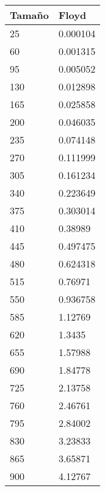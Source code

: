 \begin{tabular}[H]{|ll|}
\hline
\textbf{Tamaño} & \textbf{Floyd} \\ \hline
25 & 0.000104 \\ \hline
60 & 0.001315 \\ \hline
95 & 0.005052 \\ \hline
130 & 0.012898 \\ \hline
165 & 0.025858 \\ \hline
200 & 0.046035 \\ \hline
235 & 0.074148 \\ \hline
270 & 0.111999 \\ \hline
305 & 0.161234 \\ \hline
340 & 0.223649 \\ \hline
375 & 0.303014 \\ \hline
410 & 0.38989 \\ \hline
445 & 0.497475 \\ \hline
480 & 0.624318 \\ \hline
515 & 0.76971 \\ \hline
550 & 0.936758 \\ \hline
585 & 1.12769 \\ \hline
620 & 1.3435 \\ \hline
655 & 1.57988 \\ \hline
690 & 1.84778 \\ \hline
725 & 2.13758 \\ \hline
760 & 2.46761 \\ \hline
795 & 2.84002 \\ \hline
830 & 3.23833 \\ \hline
865 & 3.65871 \\ \hline
900 & 4.12767 \\ \hline

\end{tabular}
